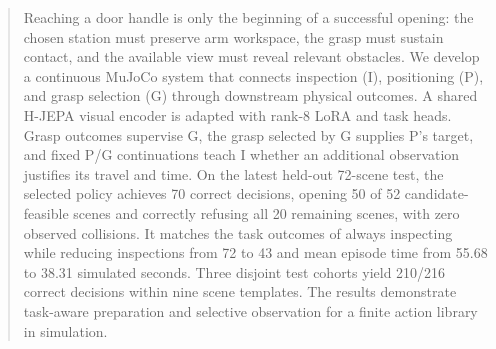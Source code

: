 \begin{abstract}
Reaching a door handle is only the beginning of a successful opening: the
chosen station must preserve arm workspace, the grasp must sustain contact,
and the available view must reveal relevant obstacles. We develop a continuous
MuJoCo system that connects inspection (I), positioning (P), and grasp selection
(G) through downstream physical outcomes. A shared H-JEPA visual encoder is
adapted with rank-8 LoRA and task heads. Grasp outcomes supervise G, the grasp
selected by G supplies P's target, and fixed P/G continuations teach I whether
an additional observation justifies its travel and time. On the latest held-out
72-scene test, the selected policy achieves 70 correct decisions, opening
50 of 52 candidate-feasible scenes and correctly refusing all 20 remaining
scenes, with zero observed collisions. It matches the task outcomes of always
inspecting while reducing inspections from 72 to 43 and mean episode time from
55.68 to 38.31 simulated seconds. Three disjoint test cohorts yield 210/216
correct decisions within nine scene templates. The results demonstrate
task-aware preparation and selective observation for a finite action library
in simulation.
\end{abstract}
